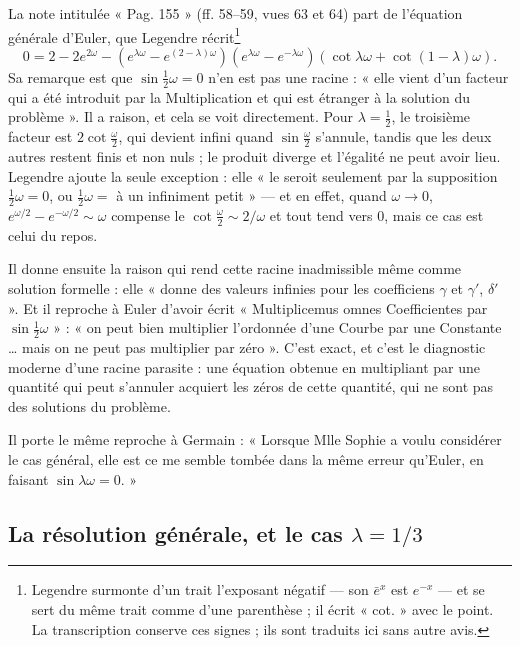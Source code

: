 \documentclass[11pt,a4paper]{article}
\begin{document}
La note intitulée « Pag. 155 » (ff. 58–59, vues 63 et 64) part de l'équation
générale d'Euler, que Legendre récrit\footnote{Legendre surmonte d'un trait
l'exposant négatif — son $\bar{e}^{x}$ est $e^{-x}$ — et se sert du même trait
comme d'une parenthèse ; il écrit « cot. » avec le point. La transcription
conserve ces signes ; ils sont traduits ici sans autre avis.}
\[
  0 = 2 - 2e^{2\omega}
    - \left(e^{\lambda\omega} - e^{(2-\lambda)\omega}\right)
      \left(e^{\lambda\omega} - e^{-\lambda\omega}\right)
      \left(\cot \lambda\omega + \cot (1-\lambda)\omega\right).
\]
Sa remarque est que $\sin\frac{1}{2}\omega = 0$ n'en est pas une racine :
« elle vient d'un facteur qui a été introduit par la Multiplication et qui est
étranger à la solution du problème ». Il a raison, et cela se voit
directement. Pour $\lambda = \frac12$, le troisième facteur est
$2\cot\frac{\omega}{2}$, qui devient infini quand $\sin\frac{\omega}{2}$
s'annule, tandis que les deux autres restent finis et non nuls ; le produit
diverge et l'égalité ne peut avoir lieu. Legendre ajoute la seule exception :
elle « le seroit seulement par la supposition $\frac12\omega = 0$, ou
$\frac12\omega =$ à un infiniment petit » — et en effet, quand $\omega\to 0$,
$e^{\omega/2}-e^{-\omega/2}\sim\omega$ compense le $\cot\frac\omega2\sim 2/\omega$
et tout tend vers $0$, mais ce cas est celui du repos.

Il donne ensuite la raison qui rend cette racine inadmissible même comme
solution formelle : elle « donne des valeurs infinies pour les coefficiens
$\gamma$ et $\gamma'$, $\delta'$ ». Et il reproche à Euler d'avoir écrit
« Multiplicemus omnes Coefficientes par $\sin\frac12\omega$ » : « on peut bien
multiplier l'ordonnée d'une Courbe par une Constante \ldots{} mais on ne peut
pas multiplier par zéro ». C'est exact, et c'est le diagnostic moderne d'une
racine parasite : une équation obtenue en multipliant par une quantité qui
peut s'annuler acquiert les zéros de cette quantité, qui ne sont pas des
solutions du problème.

Il porte le même reproche à Germain : « Lorsque Mlle Sophie a
voulu considérer le cas général, elle est ce me semble tombée dans la même
erreur qu'Euler, en faisant $\sin\lambda\omega = 0$. »

\subsection*{La résolution générale, et le cas $\lambda = 1/3$}
\end{document}
